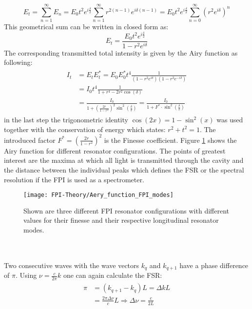 \begin{equation*}
	E_t = \sum_{n=1}^{\infty} E_n = E_0 t^2 e^{i\frac{\delta}{2}} \sum_{n=1}^{\infty} r^{2(n-1)}e^{i\delta(n-1)}= E_0t^2e^{i\frac{\delta}{2}}\sum_{n=0}^{\infty}\left(r^2 e^{i\delta} \right)^n
\end{equation*}
This geometrical sum can be written in closed form as:
\begin{equation}
	E_t = \frac{E_0 t^2 e^{i\frac{\delta}{2}}}{1-r^2e^{i\delta}}
	\label{FPI_wave_amplitudes_trans_total}
\end{equation}
The corresponding transmitted total intensity is given by the Airy function as following:
\begin{align}
	\begin{split}
		I_t&= E_tE_t^*= E_0E_0^* t^4 \frac{1}{(1-r^2e^{i\delta})(1-r^2e^{-i\delta})}\\
		&=I_0 t^4 \frac{1}{1+r^4-2r^2\cos(\delta)}\\
		&=\frac{I_0}{1+\left(\frac{2r}{1-r^2}\right)^2\sin^2(\frac{\delta}{2})} = \frac{I_0}{1+F^*\cdot\sin^2(\frac{\delta}{2})}
		\label{eq:airy_function}
	\end{split}
\end{align}
in the last step the trigonometric identity $\cos(2x)=1-\sin^2(x)$ was used together with the conservation of energy which states: $r^2+t^2=1$. The introduced factor $F^*=\left(\frac{2r}{1-r^2}\right)^2$ is the Finesse coefficient. Figure \ref{figure:FPI_aery_function} shows the Airy function for different resonator configurations. The points of greatest interest are the maxima at which all light is transmitted through the cavity and the distance between the individual peaks which defines the FSR or the spectral resolution if the FPI is used as a spectrometer.
\begin{figure}[ht]
	\centering
	\texttt{[image: FPI-Theory/Aery\_function\_FPI\_modes]}
	\caption{Shown are three different FPI resonator configurations with different values for their finesse and their respective longitudinal resonator modes.}
	\label{figure:FPI_aery_function}
\end{figure}\\\\ \noindent
Two consecutive waves with the wave vectors $k_q$ and $k_{q+1}$ have a phase difference of $\pi$. Using $\nu= \frac{c}{2\pi} k$ one can again calculate the FSR:
\begin{align}
	\begin{split}
		\pi &= (k_{q+1} - k_q)L  = \Delta k L\\
		&= \frac{2\pi \Delta \nu}{c}L \Rightarrow \Delta \nu = \frac{c}{2L}
		\label{eq:FSR_calculated}
	\end{split}
\end{align}
